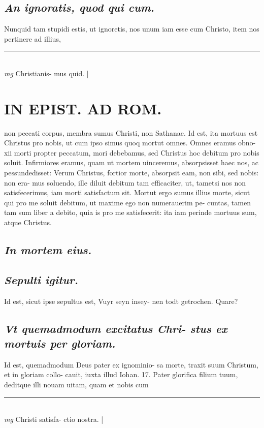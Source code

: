 \documentclass{article}
\begin{document}
\begin{pages}
\subsection*{\textit{An ignoratis, quod qui cum. }}\pstart Nunquid tam stupidi estis, ut ignoretis, nos unum iam esse cum Christo, item nos pertinere ad illius,  \pend
\vspace{0.5cm}\noindent
\vspace{0.2cm}\rule{1cm}{0.2pt}\\ 
\hspace{0.2cm}\textit{mg}
\footnotesize Christianis- mus quid. 
\normalsize| 
\section*{IN EPIST. AD ROM.  }
\marginpar{[ p.59 ]}\pstart non peccati eorpus, membra sumus Christi, non Sathanae.   \pend\pstart Id est, ita mortuus est Christus pro nobis, ut cum ipso simus quoq mortut omnes. Omnes eramus obno- xii morti propter peccatum, mori debebamus, sed Christus hoc debitum pro nobis soluit. Infirmiores eramus, quam ut mortem uinceremus, absorpsisset haec nos, ac pessundedisset: Verum Christus, fortior morte, absorpsit eam, non sibi, sed nobis: non era- mus soluendo, ille diluit debitum tam efficaciter, ut, tametsi nos non satisfecerimus, iam morti satisfactum sit. Mortut ergo sumus illius morte, sicut qui pro me soluit debitum, ut maxime ego non numerauerim pe- cuntas, tamen tam sum liber a debito, quia is pro me satisfecerit: ita iam perinde mortuus sum, atque Christus.   \pend
{}
{}
\subsection*{\textit{In mortem eius. }}
{}
\subsection*{\textit{Sepulti igitur. }}\pstart Id est, sicut ipse sepultus est, Vuyr seyn insey- nen todt getrochen. Quare?  \pend
{}
{}
\subsection*{\textit{Vt quemadmodum excitatus Chri- stus ex mortuis per gloriam. }}\pstart Id est, quemadmodum Deus pater ex ignominio- sa morte, traxit suum Christum, et in gloriam collo- cauit, iuxta illud Iohan. 17. Pater glorifica filium tuum, deditque illi nouam uitam, quam et nobis cum  \pend
\vspace{0.5cm}\noindent
\vspace{0.2cm}\rule{1cm}{0.2pt}\\ 
\hspace{0.2cm}\textit{mg}
\footnotesize Christi satisfa- ctio nostra.  
\normalsize| 

\end{pages}
\end{document}

